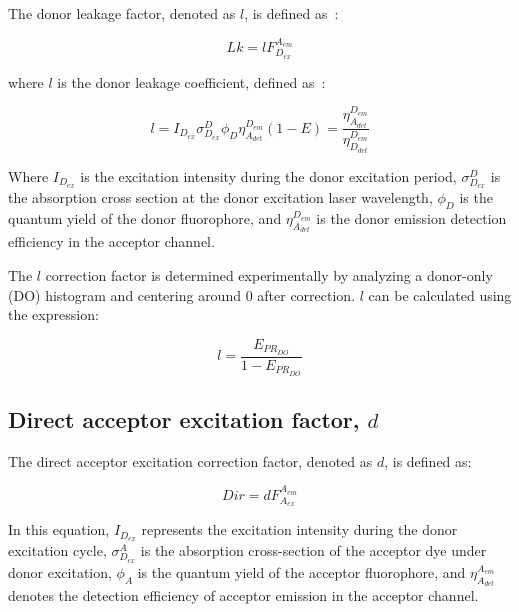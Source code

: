 The donor leakage factor, denoted as $l$, is defined as~\cite{lee_BPJ_2005}:

\begin{equation}
\label{eqn:lk}
Lk = l F_{D_{ex}}^{A_{em}}
\end{equation}

\noindent
where $l$ is the donor leakage coefficient, defined as~\cite{lee_BPJ_2005}:

\begin{equation}
    \label{eqn:l}
    l = I_{D_{ex}}\sigma^D_{D_{ex}}\phi_D\eta^{D_{em}}_{A_{det}}(1-E) = \frac{\eta^{D_{em}}_{A_{det}}}{\eta^{D_{em}}_{D_{det}}}
\end{equation}

\noindent
Where $I_{D_{ex}}$ is the excitation intensity during the donor excitation period, $\sigma^D_{D_{ex}}$ is the absorption cross section at the donor excitation laser wavelength, $\phi_D$ is the quantum yield of the donor fluorophore, and $\eta^{D_{em}}_{A_{det}}$ is the donor emission detection efficiency in the acceptor channel.

The $l$ correction factor is determined experimentally by analyzing a donor-only (DO) histogram and centering around 0 after correction. 
$l$ can be calculated using the expression:

\begin{equation}
\label{eqn:lk_do}
l = \frac{E_{{PR}_{DO}}}{1-E_{{PR}_{DO}}}
\end{equation}

\subsection{Direct acceptor excitation factor, $d$}
\label{sec:dir_apdx}

The direct acceptor excitation correction factor, denoted as $d$, is defined as:

\begin{equation}
\label{eqn:dir}
Dir = d F_{A_{ex}}^{A_{em}}
\end{equation}

\noindent
In this equation, $I_{D_{ex}}$ represents the excitation intensity during the donor excitation cycle, $\sigma^A_{D_{ex}}$ is the absorption cross-section of the acceptor dye under donor excitation, $\phi_A$ is the quantum yield of the acceptor fluorophore, and $\eta^{A_{em}}_{A_{det}}$ denotes the detection efficiency of acceptor emission in the acceptor channel.

